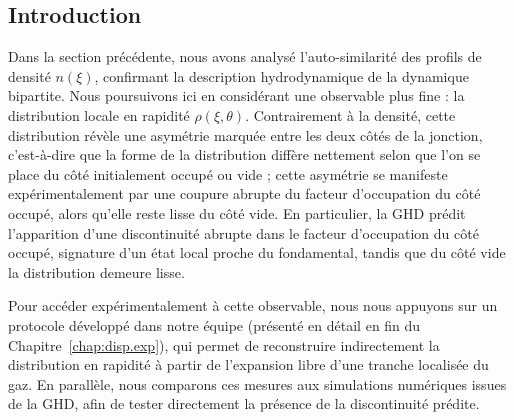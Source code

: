 \subsection*{Introduction}

Dans la section précédente, nous avons analysé l’auto-similarité des profils de densité $n(\xi)$, confirmant la description hydrodynamique de la dynamique bipartite. Nous poursuivons ici en considérant une observable plus fine : la distribution locale en rapidité $\rho(\xi,\theta)$. Contrairement à la densité, cette distribution révèle une asymétrie marquée entre les deux côtés de la jonction, c’est-à-dire que la forme de la distribution diffère nettement selon que l’on se place du côté initialement occupé ou vide ; cette asymétrie se manifeste expérimentalement par une coupure abrupte du facteur d’occupation du côté occupé, alors qu’elle reste lisse du côté vide. En particulier, la \gls{GHD} prédit l’apparition d’une discontinuité abrupte dans le facteur d’occupation du côté occupé, signature d’un état local proche du fondamental, tandis que du côté vide la distribution demeure lisse.

\medskip

Pour accéder expérimentalement à cette observable, nous nous appuyons sur un protocole développé dans notre équipe \cite{PhysRevLett.133.113402} (présenté en détail en fin du Chapitre~\ref{chap:disp.exp}), qui permet de reconstruire indirectement la distribution en rapidité à partir de l’expansion libre d’une tranche localisée du gaz. En parallèle, nous comparons ces mesures aux simulations numériques issues de la GHD, afin de tester directement la présence de la discontinuité prédite.



